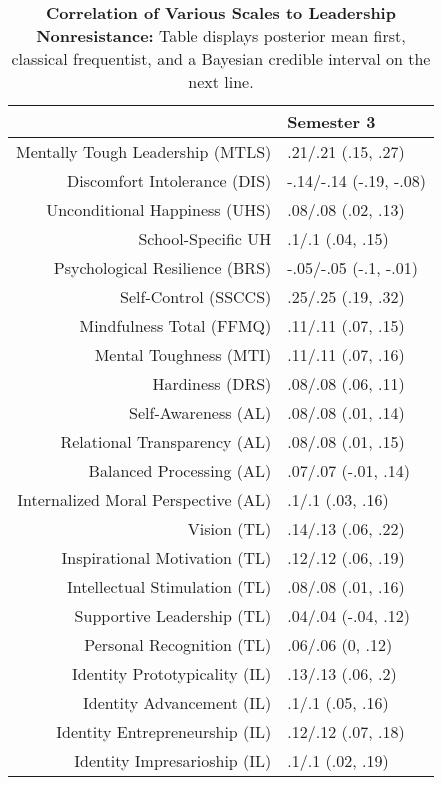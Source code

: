 \begin{table}[ht]
\centering
\begin{tabular}{rl}
  \hline
 & Semester 3 \\ 
  \hline
Mentally Tough Leadership (MTLS) & .21/.21 (.15, .27) \\ 
  Discomfort Intolerance (DIS) & -.14/-.14 (-.19, -.08) \\ 
  Unconditional Happiness (UHS) & .08/.08 (.02, .13) \\ 
  School-Specific UH & .1/.1 (.04, .15) \\ 
  Psychological Resilience (BRS) & -.05/-.05 (-.1, -.01) \\ 
  Self-Control (SSCCS) & .25/.25 (.19, .32) \\ 
  Mindfulness Total (FFMQ) & .11/.11 (.07, .15) \\ 
  Mental Toughness (MTI) & .11/.11 (.07, .16) \\ 
  Hardiness (DRS) & .08/.08 (.06, .11) \\ 
  Self-Awareness (AL) & .08/.08 (.01, .14) \\ 
  Relational Transparency (AL) & .08/.08 (.01, .15) \\ 
  Balanced Processing (AL) & .07/.07 (-.01, .14) \\ 
  Internalized Moral Perspective (AL) & .1/.1 (.03, .16) \\ 
  Vision (TL) & .14/.13 (.06, .22) \\ 
  Inspirational Motivation (TL) & .12/.12 (.06, .19) \\ 
  Intellectual Stimulation (TL) & .08/.08 (.01, .16) \\ 
  Supportive Leadership (TL) & .04/.04 (-.04, .12) \\ 
  Personal Recognition (TL) & .06/.06 (0, .12) \\ 
  Identity Prototypicality (IL) & .13/.13 (.06, .2) \\ 
  Identity Advancement (IL) & .1/.1 (.05, .16) \\ 
  Identity Entrepreneurship (IL) & .12/.12 (.07, .18) \\ 
  Identity Impresarioship (IL) & .1/.1 (.02, .19) \\ 
   \hline
\end{tabular}
\caption{\textbf{Correlation of Various Scales to Leadership Nonresistance:} Table displays posterior mean first, classical frequentist, and a Bayesian credible interval on the next line.} 
\label{tab:lnr_corr}
\end{table}
